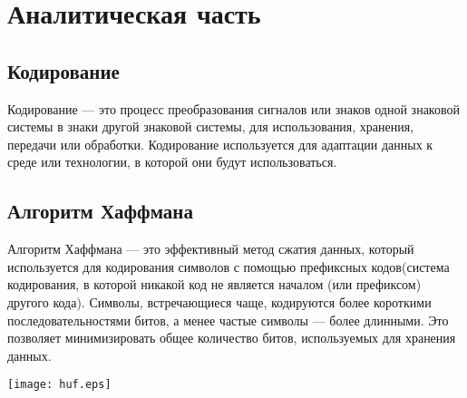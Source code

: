 \chapter{Аналитическая часть}
\section{Кодирование}
Кодирование --- это процесс преобразования сигналов или знаков одной знаковой системы в знаки другой знаковой системы, для использования, хранения, передачи или обработки. Кодирование используется для адаптации данных к среде или технологии, в которой они будут использоваться.

\section{Алгоритм Хаффмана}
Алгоритм Хаффмана — это эффективный метод сжатия данных, который используется для кодирования символов с помощью префиксных кодов(система кодирования, в которой никакой код не является началом (или префиксом) другого кода). Символы, встречающиеся чаще, кодируются более короткими последовательностями битов, а менее частые символы — более длинными. Это позволяет минимизировать общее количество битов, используемых для хранения данных.

{\centering
\texttt{[image: huf.eps]}
}
\clearpage
